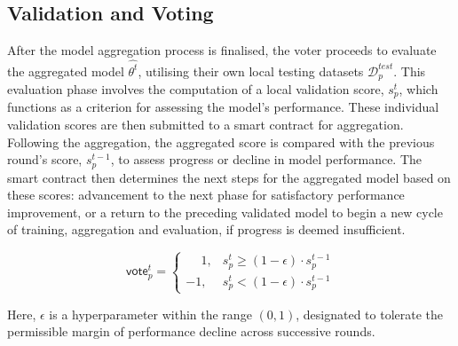 \documentclass[conference]{IEEEtran}
\newcommand{\rui}[1]{{\color{black} #1}}
\begin{document}
\subsection{\FL Validation and Voting}

\begin{itemize}

    \rui{\item After the model aggregation process is finalised, the voter proceeds to evaluate the aggregated model $\hat{\theta^t}$, utilising their own local testing datasets $\mathcal{D}_p^{test}$. This evaluation phase involves the computation of a local validation score, $s^{t}_p$, which functions as a criterion for assessing the model's performance. These individual validation scores are then submitted to a smart contract for aggregation. Following the aggregation, the aggregated score is compared with the previous round's score, $s^{t-1}_p$, to assess progress or decline in model performance. The smart contract then determines the next steps for the aggregated model based on these scores: advancement to the next phase for satisfactory performance improvement, or a return to the preceding validated model to begin a new cycle of training, aggregation and evaluation, if progress is deemed insufficient.
    }

\begin{equation*}
  \mathsf{vote}_p^t =
    \begin{cases}
      \phantom{+}1, & s^{t}_p \ge (1 - \epsilon) \cdot s^{t-1}_p \\
      -1, & s^{t}_p < (1 - \epsilon)\cdot  s^{t-1}_p
    \end{cases} 
\end{equation*}

Here, $\epsilon$ is a hyperparameter within the range $(0, 1)$, designated to tolerate the permissible margin of performance decline across successive rounds.


\end{itemize}
\end{document}
